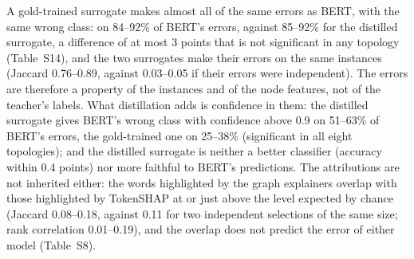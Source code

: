 \documentclass[preprint, times, review, 10pt]{elsarticle}
\begin{document}
\begin{table}[H]
\centering
\scriptsize
\setlength{\tabcolsep}{4pt}
\caption{Gold-trained control. For each topology, the distilled surrogate (trained on the teacher's labels) and the gold-trained surrogate (same graphs, node features, architecture and protocol, trained on the gold labels) are compared against BERT's gold-label errors on the test split: accuracy with respect to the gold labels; fraction of BERT's errors on which the surrogate predicts the same wrong class as BERT; fraction of BERT's errors on which it does so with confidence above 0.9. \(^{*}\): the 95\% paired-bootstrap interval of the difference between the two surrogates excludes zero (intervals in Table~S14). A seed replicate of each surrogate does not narrow the gap (Table~S9).}
\label{tab:control}
\end{table}

A gold-trained surrogate makes almost all of the same errors as BERT, with the same wrong class: on 84--92\% of BERT's errors, against 85--92\% for the distilled surrogate, a difference of at most 3 points that is not significant in any topology (Table~S14), and the two surrogates make their errors on the same instances (Jaccard 0.76--0.89, against 0.03--0.05 if their errors were independent). The errors are therefore a property of the instances and of the node features, not of the teacher's labels. What distillation adds is confidence in them: the distilled surrogate gives BERT's wrong class with confidence above 0.9 on 51--63\% of BERT's errors, the gold-trained one on 25--38\% (significant in all eight topologies); and the distilled surrogate is neither a better classifier (accuracy within 0.4 points) nor more faithful to BERT's predictions. The attributions are not inherited either: the words highlighted by the graph explainers overlap with those highlighted by TokenSHAP at or just above the level expected by chance (Jaccard 0.08--0.18, against 0.11 for two independent selections of the same size; rank correlation 0.01--0.19), and the overlap does not predict the error of either model (Table~S8).
\end{document}
